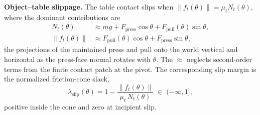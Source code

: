\documentclass[10pt, conference]{IEEEtran}
\begin{document}
\noindent \textbf{Object--table slippage.} The table contact slips when $\lVert f_t(\theta)\rVert = \mu_t N_t(\theta)$, where the dominant contributions are
\begin{align}
    N_t(\theta) &\approx mg + F_{\mathrm{press}}\cos\theta + F_{\mathrm{pull}}(\theta)\sin\theta, \label{eq:Nt}\\
    \lVert f_t(\theta)\rVert &\approx F_{\mathrm{pull}}(\theta)\cos\theta + F_{\mathrm{press}}\sin\theta,
    \label{eq:ft}
\end{align}
the projections of the maintained press and pull onto the world vertical and horizontal as the press-face normal rotates with $\theta$. The $\approx$ neglects second-order terms from the finite contact patch at the pivot. The corresponding slip margin is the normalized friction-cone slack,
\begin{equation}
    \lambda_{\mathrm{slip}}(\theta)
    = 1 - \frac{\lVert f_t(\theta)\rVert}{\mu_t\, N_t(\theta)}
    \;\in\;(-\infty, 1],
    \label{eq:m_slip}
\end{equation}
positive inside the cone and zero at incipient slip.
\end{document}
